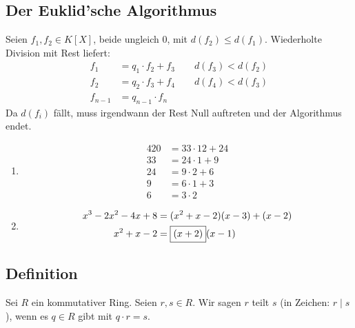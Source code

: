 \subsection{Der Euklid'sche Algorithmus} %
\label{sub:411}
Seien $f_1, f_2 \in K[X]$, beide ungleich $0$, mit $d(f_2) \le d(f_1)$. Wiederholte Division mit Rest liefert:
\begin{align*}
	f_1 &= q_1 \cdot f_2 + f_3 \qquad d(f_3) < d(f_2) \\
	f_2 &= q_2 \cdot f_3 + f_4 \qquad d(f_4) < d(f_3) \\
	f_{n-1} &= q_{n-1} \cdot f_n
\end{align*}
Da $d(f_i)$ fällt, muss irgendwann der Rest Null auftreten und der Algorithmus endet.
\begin{enumerate}[1)]
	\item \begin{align*}
		420 &= 33 \cdot 12 + 24 \\
		33 &= 24 \cdot 1 + 9 \\
		24 &= 9 \cdot 2 + 6 \\
		9 &= 6 \cdot 1 +3 \\
		6 &= \boxed{3} \cdot 2
	\end{align*}
	\item \begin{align*}
		x^3 - 2x^2 -4x +8 &= (x^2 +x -2) (x-3) + (x-2) \\ 
		x^2 +x-2 &= \boxed{(x+2)}(x-1)
	\end{align*}
\end{enumerate}

\subsection[Definition von $r$ teilt $s$]{Definition} %
\label{sub:412}
Sei $R$ ein kommutativer Ring. Seien $r,s \in R$. Wir sagen $r$ teilt $s$ (in Zeichen: $r \mid s$), wenn es $q \in R$ gibt mit $q \cdot r=s$.

